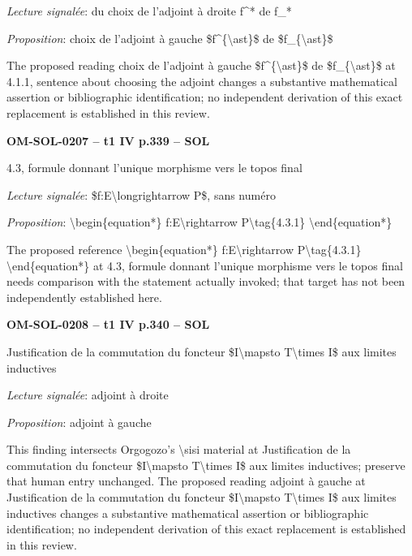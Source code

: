 \emph{Lecture signalée}: du choix de l'adjoint à droite f\textasciicircum{}* de f\_*\par
\emph{Proposition}: choix de l'adjoint à gauche \$f\textasciicircum{}\{\textbackslash{}ast\}\$ de \$f\_\{\textbackslash{}ast\}\$\par
The proposed reading choix de l'adjoint à gauche \$f\textasciicircum{}\{\textbackslash{}ast\}\$ de \$f\_\{\textbackslash{}ast\}\$ at 4.1.1, sentence about choosing the adjoint changes a substantive mathematical assertion or bibliographic identification; no independent derivation of this exact replacement is established in this review.\par
\par\noindent\textbf{OM-SOL-0207 -- t1 IV p.339 -- SOL}\par
4.3, formule donnant l'unique morphisme vers le topos final\par
\emph{Lecture signalée}: \$f:E\textbackslash{}longrightarrow P\$, sans numéro\par
\emph{Proposition}: \textbackslash{}begin\{equation*\} f:E\textbackslash{}rightarrow P\textbackslash{}tag\{4.3.1\} \textbackslash{}end\{equation*\}\par
The proposed reference \textbackslash{}begin\{equation*\} f:E\textbackslash{}rightarrow P\textbackslash{}tag\{4.3.1\} \textbackslash{}end\{equation*\} at 4.3, formule donnant l'unique morphisme vers le topos final needs comparison with the statement actually invoked; that target has not been independently established here.\par
\par\noindent\textbf{OM-SOL-0208 -- t1 IV p.340 -- SOL}\par
Justification de la commutation du foncteur \$I\textbackslash{}mapsto T\textbackslash{}times I\$ aux limites inductives\par
\emph{Lecture signalée}: adjoint à droite\par
\emph{Proposition}: adjoint à gauche\par
This finding intersects Orgogozo's \textbackslash{}sisi material at Justification de la commutation du foncteur \$I\textbackslash{}mapsto T\textbackslash{}times I\$ aux limites inductives; preserve that human entry unchanged. The proposed reading adjoint à gauche at Justification de la commutation du foncteur \$I\textbackslash{}mapsto T\textbackslash{}times I\$ aux limites inductives changes a substantive mathematical assertion or bibliographic identification; no independent derivation of this exact replacement is established in this review.\par
